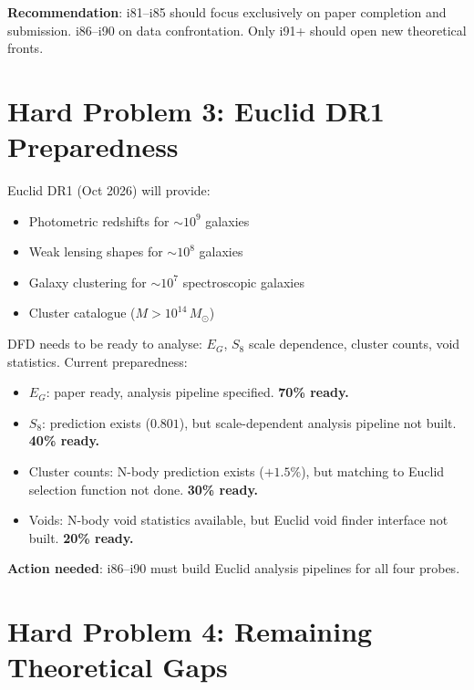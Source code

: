 \documentclass[11pt,a4paper]{article}
\begin{document}
\textbf{Recommendation}: i81--i85 should focus exclusively on paper completion and submission. i86--i90 on data confrontation. Only i91+ should open new theoretical fronts.

\section{Hard Problem 3: Euclid DR1 Preparedness}

Euclid DR1 (Oct 2026) will provide:
\begin{itemize}[nosep]
\item Photometric redshifts for $\sim 10^9$ galaxies
\item Weak lensing shapes for $\sim 10^8$ galaxies
\item Galaxy clustering for $\sim 10^7$ spectroscopic galaxies
\item Cluster catalogue ($M > 10^{14}\,M_\odot$)
\end{itemize}

DFD needs to be ready to analyse: $E_G$, $S_8$ scale dependence, cluster counts, void statistics. Current preparedness:
\begin{itemize}[nosep]
\item $E_G$: paper ready, analysis pipeline specified. \textbf{70\% ready.}
\item $S_8$: prediction exists ($0.801$), but scale-dependent analysis pipeline not built. \textbf{40\% ready.}
\item Cluster counts: N-body prediction exists ($+1.5\%$), but matching to Euclid selection function not done. \textbf{30\% ready.}
\item Voids: N-body void statistics available, but Euclid void finder interface not built. \textbf{20\% ready.}
\end{itemize}

\textbf{Action needed}: i86--i90 must build Euclid analysis pipelines for all four probes.

\section{Hard Problem 4: Remaining Theoretical Gaps}
\end{document}
